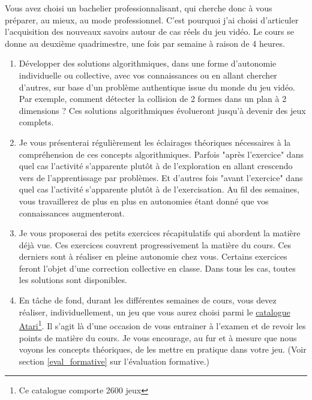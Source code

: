 Vous avez choisi un bachelier professionnalisant, qui cherche donc à vous préparer, au mieux, au mode professionnel. C’est  pourquoi j’ai choisi d’articuler l’acquisition des nouveaux savoirs autour de cas réels du jeu vidéo. Le cours se donne au deuxième quadrimestre, une fois par semaine à raison de 4 heures.
\begin{enumerate}
    \item Développer des solutions algorithmiques, dans une forme d’autonomie individuelle ou collective, avec vos connaissances ou en allant chercher d’autres, sur base d’un problème authentique issue du monde du jeu vidéo. Par exemple, comment détecter la collision de 2 formes dans un plan à 2 dimensions ? Ces solutions algorithmiques évolueront jusqu'à devenir des jeux complets.
    \item Je vous présenterai régulièrement les éclairages théoriques nécessaires à la compréhension de ces concepts algorithmiques. Parfois "après l’exercice" dans quel cas l’activité s’apparente plutôt à de l’exploration en allant crescendo vers de l'apprentissage par problèmes. Et d’autres fois "avant l’exercice" dans quel cas l’activité s’apparente plutôt à de l’exercisation. Au fil des semaines, vous travaillerez de plus en plus en autonomies étant donné que vos connaissances augmenteront.
    \item Je vous proposerai des petits exercices récapitulatifs qui abordent la matière déjà vue. Ces exercices couvrent progressivement la matière du cours. Ces derniers sont à réaliser en pleine autonomie chez vous. Certains exercices feront l'objet d'une correction collective en classe. Dans tous les cas, toutes les solutions sont disponibles.
    \item En tâche de fond, durant les différentes semaines de cours, vous devez réaliser, individuellement, un jeu que vous aurez choisi parmi le \href{https://fr.wikipedia.org/wiki/Liste_de_jeux_Atari_2600}{catalogue Atari}\footnote{Ce catalogue comporte 2600 jeux}. Il s’agit là d’une occasion de vous entrainer à l’examen et de revoir les points de matière du cours. Je vous encourage, au fur et à mesure que nous voyons les concepts théoriques, de les mettre en pratique dans votre jeu. (Voir section \ref{eval_formative} sur l'évaluation formative.)
\end{enumerate}

\clearpage
